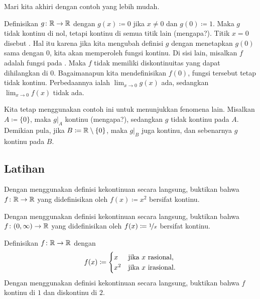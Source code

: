 Mari kita akhiri dengan contoh yang lebih mudah.

\begin{example} \label{example:removablediscont}
Definisikan
$g \colon {\mathbb{R}} \to {\mathbb{R}}$ dengan $g(x) \coloneqq 0$ jika $x \neq 0$ dan
$g(0) \coloneqq 1$.  Maka $g$ tidak kontinu di nol, tetapi kontinu di semua titik lain (mengapa?).
Titik $x=0$ disebut \emph{}.  Hal itu
karena jika kita mengubah definisi $g$ dengan menetapkan
$g(0)$ sama dengan $0$, kita akan memperoleh fungsi kontinu.  Di sisi lain,
misalkan $f$ adalah fungsi pada .
Maka $f$ tidak memiliki
diskontinuitas yang dapat dihilangkan di $0$.  Bagaimanapun kita mendefinisikan $f(0)$, fungsi tersebut
tetap tidak kontinu.  Perbedaannya ialah
$\lim_{x\to 0} g(x)$ ada, sedangkan
$\lim_{x\to 0} f(x)$ tidak ada.

Kita tetap menggunakan contoh ini untuk menunjukkan fenomena lain.
Misalkan $A \coloneqq \{ 0 \}$, maka $g|_A$ kontinu (mengapa?), sedangkan $g$ tidak kontinu pada $A$.
Demikian pula, jika $B \coloneqq {\mathbb{R}} \setminus \{0 \}$, maka $g|_B$ juga kontinu,
dan sebenarnya $g$ kontinu pada $B$.
\end{example}

\subsection{Latihan}

\begin{exercise}
Dengan menggunakan definisi kekontinuan secara langsung, buktikan bahwa
$f \colon {\mathbb{R}} \to {\mathbb{R}}$ yang didefinisikan oleh
$f(x) \coloneqq x^2$ bersifat kontinu.
\end{exercise}

\begin{exercise}
Dengan menggunakan definisi kekontinuan secara langsung, buktikan bahwa
$f \colon (0,\infty) \to {\mathbb{R}}$ yang didefinisikan oleh
$f(x) \coloneqq \nicefrac{1}{x}$ bersifat kontinu.
\end{exercise}

\begin{exercise}
Definisikan $f \colon {\mathbb{R}} \to {\mathbb{R}}$ dengan
\begin{equation*}
f(x) \coloneqq
\begin{cases}
x & \text{jika } x \text{ rasional,} \\
x^2 & \text{jika } x \text{ irasional.}
\end{cases}
\avoidbreak
\end{equation*}
Dengan menggunakan definisi kekontinuan secara langsung, buktikan bahwa
$f$ kontinu di $1$ dan diskontinu di $2$.
\end{exercise}

